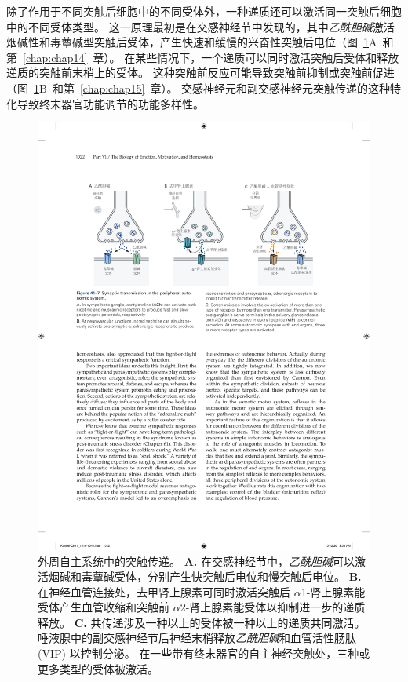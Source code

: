 除了作用于不同突触后细胞中的不同受体外，一种递质还可以激活同一突触后细胞中的不同受体类型。
这一原理最初是在交感神经节中发现的，其中\textit{乙酰胆碱}激活烟碱性和毒蕈碱型突触后受体，产生快速和缓慢的兴奋性突触后电位（图~\ref{fig:41_7}A~和第~\ref{chap:chap14}~章）。
在某些情况下，一个递质可以同时激活突触后受体和释放递质的突触前末梢上的受体。
这种突触前反应可能导致突触前抑制或突触前促进（图~\ref{fig:41_7}B~和第~\ref{chap:chap15}~章）。
交感神经元和副交感神经元突触传递的这种特化导致终末器官功能调节的功能多样性。


\begin{figure}[htbp]
	\centering
	\includegraphics[width=0.8\linewidth]{chap41/fig_41_7}
	\caption{外周自主系统中的突触传递。
		\textbf{A.} 在交感神经节中，\textit{乙酰胆碱}可以激活烟碱和毒蕈碱受体，分别产生快突触后电位和慢突触后电位。
		\textbf{B.} 在神经血管连接处，去甲肾上腺素可同时激活突触后 $\alpha$1-肾上腺素能受体产生血管收缩和突触前 $\alpha$2-肾上腺素能受体以抑制进一步的递质释放。
		\textbf{C.} 共传递涉及一种以上的受体被一种以上的递质共同激活。
		唾液腺中的副交感神经节后神经末梢释放\textit{乙酰胆碱}和血管活性肠肽 (VIP) 以控制分泌。
		在一些带有终末器官的自主神经突触处，三种或更多类型的受体被激活。}
	\label{fig:41_7}
\end{figure}



